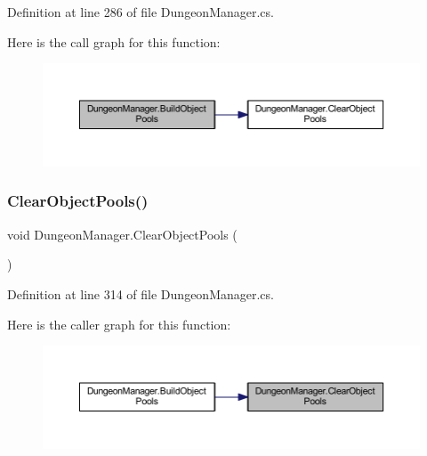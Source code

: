Definition at line 286 of file Dungeon\+Manager.\+cs.

Here is the call graph for this function\+:
\nopagebreak
\begin{figure}[H]
\begin{center}
\leavevmode
\includegraphics[width=350pt]{class_dungeon_manager_a5a401d26555b3eff094668620d4857ca_cgraph}
\end{center}
\end{figure}
\mbox{\label{class_dungeon_manager_a693d00ae1ca65d58dab634deaa9cfec9}} 
\subsubsection{\texorpdfstring{ClearObjectPools()}{ClearObjectPools()}}
{\footnotesize\ttfamily void Dungeon\+Manager.\+Clear\+Object\+Pools (\begin{DoxyParamCaption}{ }\end{DoxyParamCaption})}



Definition at line 314 of file Dungeon\+Manager.\+cs.

Here is the caller graph for this function\+:
\nopagebreak
\begin{figure}[H]
\begin{center}
\leavevmode
\includegraphics[width=350pt]{class_dungeon_manager_a693d00ae1ca65d58dab634deaa9cfec9_icgraph}
\end{center}
\end{figure}
\mbox{\label{class_dungeon_manager_ab7edf3b19e13892178a34ece10f4c5d5}} 
